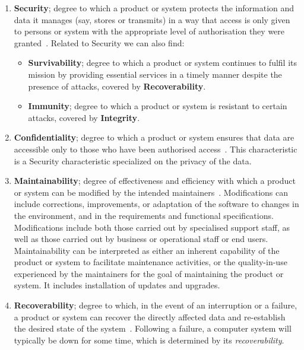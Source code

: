 \begin{enumerate}
    \item \textbf{Security}; degree to which a product or system protects the information and data it manages (say, stores or transmits) in a way that access is only given to persons or system with the appropriate level of authorisation they were granted~\cite{iso_25010_2011_2017}. Related to Security we can also find:
    \begin{itemize}
        \item \textbf{Survivability}; degree to which a product or system continues to fulfil its mission by providing essential services in a timely manner despite the presence of attacks, covered by \textbf{Recoverability}.
        \item \textbf{Immunity}; degree to which a product or system is resistant to certain attacks, covered by \textbf{Integrity}.
    \end{itemize}
    
    \item \textbf{Confidentiality}; degree to which a product or system ensures that data are accessible only to those who have been authorised access~\cite{iso_25010_2011_2017}. This characteristic is a Security characteristic specialized on the privacy of the data.

    \item \textbf{Maintainability}; degree of effectiveness and efficiency with which a product or system can be modified by the intended maintainers~\cite{iso_25010_2011_2017}. Modifications can include corrections, improvements, or adaptation of the software to changes in the environment, and in the requirements and functional specifications. Modifications include both those carried out by specialised support staff, as well as those carried out by business or operational staff or end users. Maintainability can be interpreted as either an inherent capability of the product or system to facilitate maintenance activities, or the quality-in-use experienced by the maintainers for the goal of maintaining the product or system. It includes installation of updates and upgrades. 

    \item \textbf{Recoverability}; degree to which, in the event of an interruption or a failure, a product or system can recover the directly affected data and re-establish the desired state of the system~\cite{iso_25010_2011_2017}. Following a failure, a computer system will typically be down for some time, which is determined by its \textit{recoverability}.


\end{enumerate}
